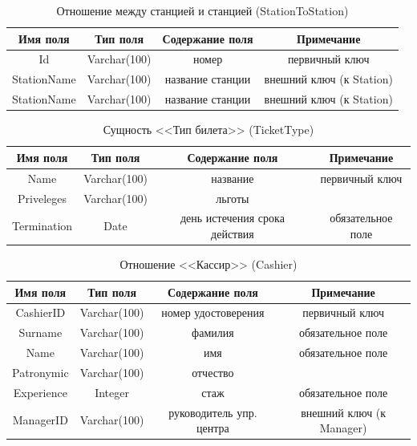 \documentclass[a4paper,10pt]{article}
\theoremstyle{plain} %
\theoremstyle{definition} %
\theoremstyle{remark} %
\theoremstyle{definition}
\begin{document}
\begin{table}[h!]
\centering
\begin{tabular}{|c|c|c|c|}
    \hline
    Имя поля & Тип поля & Содержание поля & Примечание \\
    \hline
    Id & Varchar(100) & номер & первичный ключ \\
    StationName & Varchar(100) & название станции & внешний ключ (к Station) \\
    StationName & Varchar(100) & название станции & внешний ключ (к Station) \\
    \hline
\end{tabular}
    \caption{Отношение между станцией и станцией (StationToStation)}
\end{table}


\begin{table}[h!]
\centering
\begin{tabular}{|c|c|c|c|}
\hline
    Имя поля & Тип поля & Содержание поля & Примечание \\
    \hline
    Name & Varchar(100) & название & первичный ключ  \\
    Priveleges & Varchar(100) & льготы &  \\
    Termination & Date & день истечения срока действия & обязательное поле \\
    \hline
\end{tabular}
    \caption{Сущность <<Тип билета>> (TicketType)}
\end{table}

\begin{table}[h!]
\centering
\begin{tabular}{|c|c|c|c|}
\hline
    Имя поля & Тип поля & Содержание поля & Примечание \\
    \hline
    CashierID & Varchar(100) & номер удостоверения & первичный ключ  \\
    Surname & Varchar(100) & фамилия & обязательное поле \\
    Name & Varchar(100) & имя & обязательное поле \\
    Patronymic & Varchar(100) & отчество & \\
    Experience & Integer & стаж & обязательное поле \\
    ManagerID & Varchar(100) & руководитель упр. центра & внешний ключ (к Manager) \\
    \hline
\end{tabular}
    \caption{Отношение <<Кассир>> (Cashier)}
\end{table}
\end{document}
